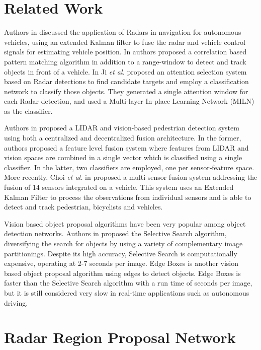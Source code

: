 \documentclass{article}
\newcommand{\ea}{\textit{et al. }}
\begin{document}
\section{Related Work}
\label{sec:related}
Authors in \cite{Gibson1994} discussed the application of Radars in navigation
for autonomous vehicles, using an extended Kalman filter to fuse the radar and
vehicle control signals for estimating vehicle position. In \cite{Miyahara2006} 
authors proposed a correlation based pattern matching algorithm in addition to 
a range-window to detect and track objects in front of a vehicle. In \cite{Ji2008} 
Ji \ea proposed an attention selection system based on Radar detections to find 
candidate targets and employ a classification network to classify those objects. 
They generated a single attention window for each Radar detection, and used a 
Multi-layer In-place Learning Network (MILN) as the classifier.

Authors in \cite{Premebida2009} proposed a LIDAR and vision-based pedestrian detection 
system using both a centralized and decentralized fusion architecture. 
In the former, authors proposed a feature level fusion system where features from LIDAR and 
vision spaces are combined in a single vector which is classified using a single 
classifier. In the latter, two classifiers are employed, one per sensor‐feature 
space. More recently, Choi \ea in \cite{Cho2014} proposed a multi-sensor fusion system 
addressing the fusion of 14 sensors integrated on a vehicle. This system uses an 
Extended Kalman Filter to process the observations from individual sensors and is 
able to detect and track pedestrian, bicyclists and vehicles.

Vision based object proposal algorithms have been very popular among object detection 
networks. Authors in \cite{ss2013} proposed the Selective Search algorithm, diversifying the search for objects by using a
variety of complementary image partitionings. Despite its high accuracy, Selective 
Search is computationally expensive, operating at 2-7 seconds per image. 
Edge Boxes \cite{edge2014} is another vision based object proposal algorithm 
using edges to detect 
objects. Edge Boxes is faster than the Selective Search algorithm with a run time of  
seconds per image, but it is still considered very slow in real-time 
applications such as autonomous driving.

\section{Radar Region Proposal Network}
\label{sec:rrpn}
\end{document}
